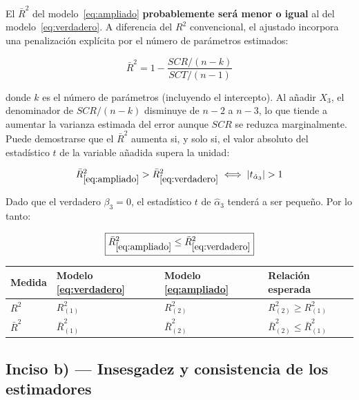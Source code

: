 \documentclass[12pt, letterpaper]{article}
\begin{document}
El $\bar{R}^2$ del modelo~\eqref{eq:ampliado} \textbf{probablemente será menor
o igual} al del modelo~\eqref{eq:verdadero}. A diferencia del $R^2$
convencional, el ajustado incorpora una penalización explícita por el número
de parámetros estimados:

\begin{equation}
  \bar{R}^2 = 1 - \frac{SCR/(n-k)}{SCT/(n-1)}
\end{equation}

donde $k$ es el número de parámetros (incluyendo el intercepto). Al añadir
$X_3$, el denominador de $SCR/(n-k)$ disminuye de $n-2$ a $n-3$, lo que
tiende a aumentar la varianza estimada del error aunque $SCR$ se reduzca
marginalmente. Puede demostrarse que el $\bar{R}^2$ aumenta si, y solo si,
el valor absoluto del estadístico $t$ de la variable añadida supera la
unidad:

\begin{equation}
  \bar{R}^2_{\eqref{eq:ampliado}} > \bar{R}^2_{\eqref{eq:verdadero}}
  \iff |t_{\hat{\alpha}_3}| > 1
\end{equation}

Dado que el verdadero $\beta_3 = 0$, el estadístico $t$ de $\hat{\alpha}_3$
tenderá a ser pequeño. Por lo tanto:

\begin{equation}
  \boxed{\bar{R}^2_{\eqref{eq:ampliado}} \leq \bar{R}^2_{\eqref{eq:verdadero}}}
\end{equation}

\begin{center}
\renewcommand{\arraystretch}{1.3}
\small
\begin{tabular}{p{2.8cm}p{3.2cm}p{3.8cm}p{3.4cm}}
\toprule
\textbf{Medida} & \textbf{Modelo \eqref{eq:verdadero}} & \textbf{Modelo \eqref{eq:ampliado}} & \textbf{Relación esperada} \\
\midrule
$R^2$       & $R^2_{(1)}$       & $R^2_{(2)}$       & $R^2_{(2)} \geq R^2_{(1)}$       \\
$\bar{R}^2$ & $\bar{R}^2_{(1)}$ & $\bar{R}^2_{(2)}$ & $\bar{R}^2_{(2)} \leq \bar{R}^2_{(1)}$ \\
\bottomrule
\end{tabular}
\end{center}

\subsection{Inciso b) --- Insesgadez y consistencia de los estimadores}
\end{document}

